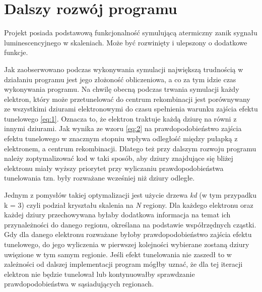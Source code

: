 \chapter{Dalszy rozwój programu}
\label{rozwoj:1}
Projekt posiada podstawową funkcjonalność symulującą atermiczny zanik sygnału luminescencyjnego w skaleniach. Może być rozwinięty i ulepszony o dodatkowe funkcje.

Jak zaobserwowano podczas wykonywania symulacji największą trudnością w działaniu programu jest jego złożoność obliczeniowa, a co za tym idzie czas wykonywania programu. Na chwilę obecną podczas trwania symulacji każdy elektron, który może przetunelować do centrum rekombinacji jest porównywany ze wszystkimi dziurami elektronowymi do czasu spełnienia warunku zajścia efektu tunelowego \ref{eq:1}. Oznacza to, że elektron traktuje każdą dziurę na równi z innymi dziurami. Jak wynika ze wzoru \ref{eq:2} na prawdopodobieństwo zajścia efektu tunelowego w znacznym stopniu wpływa odległość między pułapką z elektronem, a centrum rekombinacji. Dlatego też przy dalszym rozwoju programu należy zoptymalizować kod w taki sposób, aby dziury znajdujące się bliżej elektronu miały wyższy priorytet przy wyliczaniu prawdopodobieństwa tunelowania tzn. były rozważane wcześniej niż dziury odległe. 

Jednym z pomysłów takiej optymalizacji jest użycie drzewa \emph{kd} (w tym przypadku k = 3) czyli podział kryształu skalenia na \emph{N} regiony. Dla każdego elektronu oraz każdej dziury przechowywana byłaby dodatkowa informacja na temat ich przynależności do danego regionu, określana na podstawie współrzędnych cząstki. Gdy dla danego elektronu rozważane byłoby prawdopodobieństwo zajścia efektu tunelowego, do jego wyliczenia w pierwszej kolejności wybierane zostaną dziury uwięzione w tym samym regionie. Jeśli efekt tunelowania nie zaszedł to w zależności od dalszej implementacji program mógłby uznać, że dla tej iteracji elektron nie będzie tunelował lub kontynuowałby sprawdzanie prawdopodobieństwa w sąsiadujących regionach.

